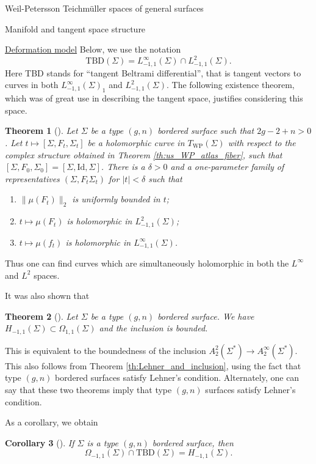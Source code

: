 \documentclass[12pt]{amsart}
\newcommand{\riem}{\Sigma}  %
\theoremstyle{plain}
\newtheorem{theorem}{Theorem}[section]
\newtheorem{corollary}[theorem]{Corollary}
\theoremstyle{definition}
\theoremstyle{remark}
\numberwithin{equation}{section} %
\numberwithin{figure}{section} %
\begin{document}
\begin{section}{Weil-Petersson Teichm\"uller spaces of general surfaces}
\begin{subsection}{Manifold and tangent space structure}
\begin{subsubsection}{{\underline{Deformation model}}}
 Below, we use the notation 
 \[  \mathrm{TBD}(\riem) = L^\infty_{-1,1}(\riem) \cap L^2_{-1,1}(\riem).   \]
 Here TBD stands for ``tangent Beltrami differential'', that is tangent vectors to curves in both $L^\infty_{-1,1}(\riem)_1$ and $L^2_{-1,1}(\riem)$. The following existence theorem, which was of great use in describing the tangent space, justifies considering this space. 
 \begin{theorem}[\cite{RSS_WP2}]
  Let $\riem$ be a type $(g,n)$ bordered surface such that $2g-2+n>0$. Let $t \mapsto [\riem,F_t,\riem_t]$ be a holomorphic curve in $T_{\mathrm{WP}}(\riem)$ with respect to the complex structure obtained in Theorem \ref{th:us_WP_atlas_fiber}, such that $[\riem,F_0,\riem_0]=[\riem,\mathrm{Id},\riem]$. There is a $\delta>0$ and a one-parameter family of representatives $(\riem,F_t\riem_t)$ for $|t|<\delta$ such that
  \begin{enumerate}[font=\upshape]
   \item $\|\mu(F_t)\|_2$ is uniformly bounded in $t$;
   \item $t\mapsto \mu(F_t)$ is holomorphic in $L^2_{-1,1}(\riem)$; 
   \item $t \mapsto \mu(f_t)$ is holomorphic in $L^\infty_{-1,1}(\riem)$. 
  \end{enumerate}
 \end{theorem} 
  Thus one can find curves which are simultaneously holomorphic in both the $L^\infty$ and $L^2$ spaces. 

  It was also shown that
  \begin{theorem}[\cite{RSS_WP2}] Let $\riem$ be a type $(g,n)$ bordered surface. We have $H_{-1,1}(\riem) \subset \Omega_{1,1}(\riem)$ and the inclusion is bounded.
  \end{theorem}
  This is equivalent to the boundedness of the inclusion $A_2^2(\riem^*) \rightarrow A_2^\infty(\riem^*)$. This also follows from Theorem \ref{th:Lehner_and_inclusion}, using the fact that type $(g,n)$ bordered surfaces satisfy Lehner's condition. Alternately, one can say that these two theorems imply that type $(g,n)$ surfaces satisfy Lehner's condition.
  
  As a corollary, we obtain
  \begin{corollary}[\cite{RSS_WP2}] \label{co:harmonic_inclusion_bounded}
   If $\riem$ is a type $(g,n)$ bordered surface, then 
   \[  \Omega_{-1,1}(\riem) \cap \mathrm{TBD}(\riem) = H_{-1,1}(\riem).   \]
  \end{corollary}
  

\end{subsubsection}
\end{subsection}
\end{section}
\end{document}
